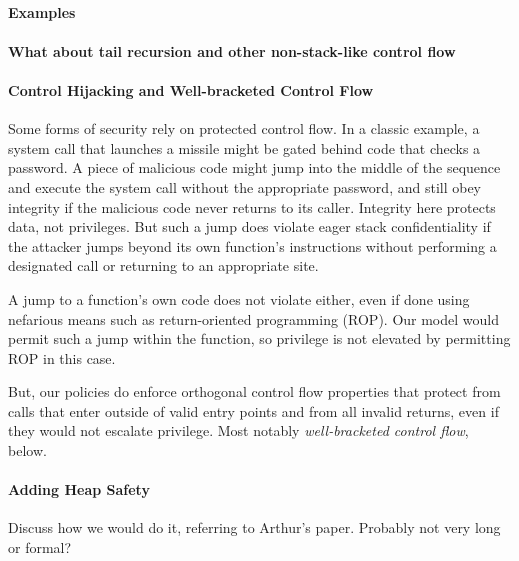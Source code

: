 \documentclass[acmsmall,review,anonymous]{acmart}\settopmatter{printfolios=true,printccs=false,printacmref=false}
\begin{document}
  \paragraph{Examples}


  \paragraph{What about tail recursion and other non-stack-like control flow}

  \paragraph{Control Hijacking and Well-bracketed Control Flow}
  
    Some forms of security rely on protected control flow. In a classic
    example, a system call that launches a missile might be gated behind code
    that checks a password. A piece of malicious code might jump into the middle
    of the sequence and execute the system call without the appropriate password,
    and still obey integrity if the malicious code never returns to its caller.
    Integrity here protects data, not privileges. But such a jump does violate
    eager stack confidentiality if the attacker jumps beyond its own function's
    instructions without performing a designated call or returning to an
    appropriate site.

    A jump to a function's own code does not violate either, even if done using
    nefarious means such as return-oriented programming (ROP). Our model would
    permit such a jump within the function, so privilege is not elevated by
    permitting ROP in this case.

    But, our policies do enforce orthogonal control flow properties that
    protect from calls that enter outside of valid entry points and from all
    invalid returns, even if they would not escalate privilege. Most notably
    {\em well-bracketed control flow}, below.

  \paragraph{Adding Heap Safety}

    Discuss how we would do it, referring to Arthur's paper.  Probably not very long or formal?
\end{document}
